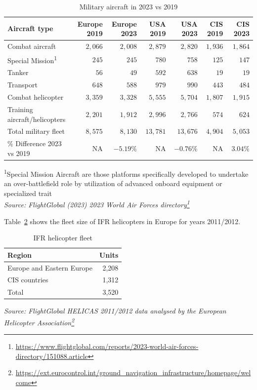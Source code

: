 \documentclass[
  11pt,
  a4paper,
]{book}
\DeclareRobustCommand{\href}[2]{#2\footnote{\url{#1}}}
\begin{document}
\hypertarget{tbl-military-aircraft}{}
\setlength{\LTpost}{0mm}
\begin{longtable}{lrrrrrr}
\caption{\label{tbl-military-aircraft}Military aircraft in 2023 vs 2019 }\tabularnewline

\toprule
Aircraft type & Europe 2019 & Europe 2023 & USA 2019 & USA 2023 & CIS 2019 & CIS 2023 \\ 
\midrule
Combat aircraft  & $2,066$ & $2,008$ & $2,879$ & $2,820$ & $1,936$ & $1,864$ \\ 
Special Mission\textsuperscript{1} & $245$ & $245$ & $780$ & $758$ & $125$ & $147$ \\ 
Tanker & $56$ & $49$ & $592$ & $638$ & $19$ & $19$ \\ 
Transport & $648$ & $588$ & $979$ & $990$ & $443$ & $484$ \\ 
Combat helicopter & $3,359$ & $3,328$ & $5,555$ & $5,704$ & $1,807$ & $1,915$ \\ 
Training aircraft/helicopters & $2,201$ & $1,912$ & $2,996$ & $2,766$ & $574$ & $624$ \\ 
Total military fleet & $8,575$ & $8,130$ & $13,781$ & $13,676$ & $4,904$ & $5,053$ \\ 
\% Difference 2023 vs 2019 & NA & $-5.19\%$ & NA & $-0.76\%$ & NA & $3.04\%$ \\ 
\bottomrule
\end{longtable}
\begin{minipage}{\linewidth}
\textsuperscript{1}Special Mission Aircraft are those platforms specifically developed to undertake an over-battlefield role by utilization of advanced onboard equipment or specialized trait\\
\emph{Source: \href{https://www.flightglobal.com/reports/2023-world-air-forces-directory/151088.article}{FlightGlobal (2023) 2023 World Air Forces directory}}\\
\end{minipage}

Table~\ref{tbl-ifr-helicopter} shows the fleet size of IFR helicopters
in Europe for years 2011/2012.

\hypertarget{tbl-ifr-helicopter}{}
\setlength{\LTpost}{0mm}
\begin{longtable}{lr}
\caption{\label{tbl-ifr-helicopter}IFR helicopter fleet }\tabularnewline

\toprule
Region & Units \\ 
\midrule
Europe and Eastern Europe & 2,208 \\ 
CIS countries & 1,312 \\ 
Total & 3,520 \\ 
\bottomrule
\end{longtable}
\begin{minipage}{\linewidth}
\emph{Source:  FlightGlobal HELICAS 2011/2012 data analysed by the \href{https://ext.eurocontrol.int/ground_navigation_infrastructure/homepage/welcome}{European Helicopter Association}}\\
\end{minipage}
\end{document}
